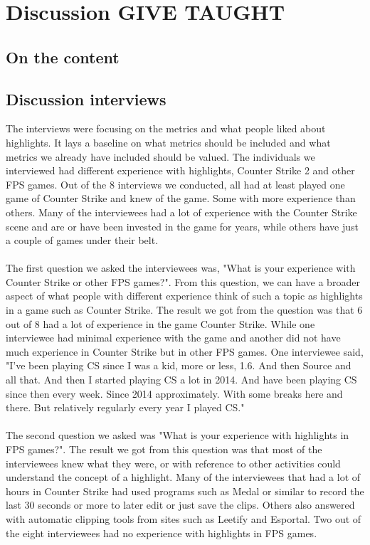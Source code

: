 
\chapter{Discussion GIVE TAUGHT}
\label{chp:discussion}
\section{On the content}
\section{Discussion interviews}
The interviews were focusing on the metrics and what people liked about highlights. It lays a baseline on what metrics should be included and what metrics we already have included should be valued. The individuals we interviewed had different experience with highlights, Counter Strike 2 and other FPS games. Out of the 8 interviews we conducted, all had at least played one game of Counter Strike and knew of the game. Some with more experience than others. Many of the interviewees had a lot of experience with the Counter Strike scene and are or have been invested in the game for years, while others have just a couple of games under their belt.\\\\
The first question we asked the interviewees was, "What is your experience with Counter Strike or other FPS games?". From this question, we can have a broader aspect of what people with different experience think of such a topic as highlights in a game such as Counter Strike. The result we got from the question was that 6 out of 8 had a lot of experience in the game Counter Strike. While one interviewee had minimal experience with the game and another did not have much experience in Counter Strike but in other FPS games. One interviewee said, "I've been playing CS since I was a kid, more or less, 1.6. And then Source and all that. And then I started playing CS a lot in 2014. And have been playing CS since then every week. Since 2014 approximately. With some breaks here and there. But relatively regularly every year I played CS."\\\\
The second question we asked was "What is your experience with highlights in FPS games?". The result we got from this question was that most of the interviewees knew what they were, or with reference to other activities could understand the concept of a highlight. Many of the interviewees that had a lot of hours in Counter Strike had used programs such as Medal or similar to record the last 30 seconds or more to later edit or just save the clips. Others also answered with automatic clipping tools from sites such as Leetify and Esportal. Two out of the eight interviewees had no experience with highlights in FPS games.\\\\

